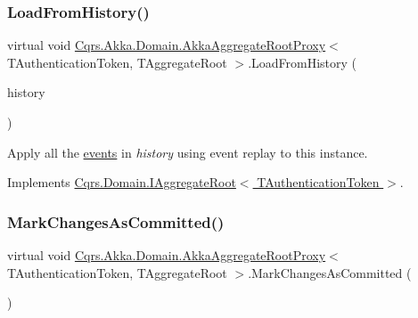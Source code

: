\subsubsection{\texorpdfstring{Load\+From\+History()}{LoadFromHistory()}}
{\footnotesize\ttfamily virtual void \hyperlink{classCqrs_1_1Akka_1_1Domain_1_1AkkaAggregateRootProxy}{Cqrs.\+Akka.\+Domain.\+Akka\+Aggregate\+Root\+Proxy}$<$ T\+Authentication\+Token, T\+Aggregate\+Root $>$.Load\+From\+History (\begin{DoxyParamCaption}\item[{I\+Enumerable$<$ \hyperlink{interfaceCqrs_1_1Events_1_1IEvent}{I\+Event}$<$ T\+Authentication\+Token $>$$>$}]{history }\end{DoxyParamCaption})\hspace{0.3cm}{\ttfamily [virtual]}}



Apply all the \hyperlink{}{events} in {\itshape history}  using event replay to this instance. 



Implements \hyperlink{interfaceCqrs_1_1Domain_1_1IAggregateRoot_afe9329ee26ae68613059189ca64dfe60_afe9329ee26ae68613059189ca64dfe60}{Cqrs.\+Domain.\+I\+Aggregate\+Root$<$ T\+Authentication\+Token $>$}.

\mbox{\label{classCqrs_1_1Akka_1_1Domain_1_1AkkaAggregateRootProxy_aaa8a46fee21b6133ae4d1b2f60983d7e_aaa8a46fee21b6133ae4d1b2f60983d7e}} 
\subsubsection{\texorpdfstring{Mark\+Changes\+As\+Committed()}{MarkChangesAsCommitted()}}
{\footnotesize\ttfamily virtual void \hyperlink{classCqrs_1_1Akka_1_1Domain_1_1AkkaAggregateRootProxy}{Cqrs.\+Akka.\+Domain.\+Akka\+Aggregate\+Root\+Proxy}$<$ T\+Authentication\+Token, T\+Aggregate\+Root $>$.Mark\+Changes\+As\+Committed (\begin{DoxyParamCaption}{ }\end{DoxyParamCaption})\hspace{0.3cm}{\ttfamily [virtual]}}



